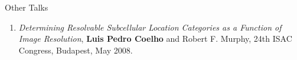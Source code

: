 \documentclass{article}
\renewcommand\subsection[1]{%
    \par\vspace{.1em}%
    {\hspace{1em}\subsubhead #1}%
    \par\vspace{.2em}%
}
\begin{document}
\subsection{Other Talks}

\begin{enumerate}
\item \emph{Determining Resolvable Subcellular Location Categories as a
Function of Image Resolution}, \textbf{Luis Pedro Coelho} and Robert F. Murphy,
24th ISAC Congress, Budapest, May 2008.
\end{enumerate}
\end{document}
